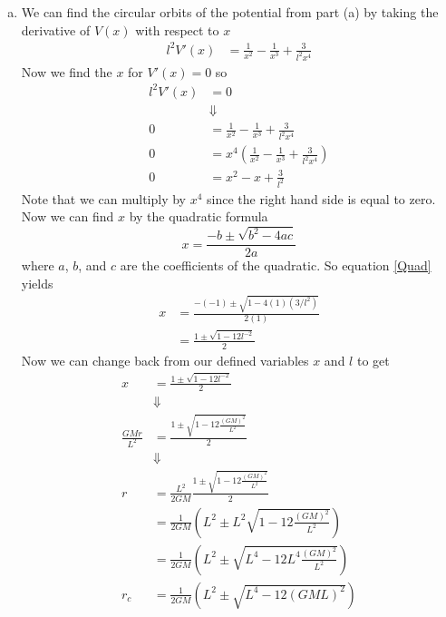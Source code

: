 \documentclass[11pt]{article}
\numberwithin{equation}{section}
\begin{document}
\begin{enumerate}[(a)]
\item
We can find the circular orbits of the potential from part (a) by taking the derivative of $V(x)$ with respect to $x$
\begin{align*}
l^2V'(x) &= \frac{1}{x^2} - \frac{1}{x^3} + \frac{3}{l^2x^4}
\end{align*}
Now we find the $x$ for $V'(x)=0$ so
\begin{align*}
l^2V'(x) &= 0\\
&\Downarrow\\
0 &= \frac{1}{x^2} - \frac{1}{x^3} + \frac{3}{l^2x^4}\\
0 &= x^4\left(\frac{1}{x^2} - \frac{1}{x^3} + \frac{3}{l^2x^4}\right)\\
0 &= x^2 - x + \frac{3}{l^2}
\end{align*}
Note that we can multiply by $x^4$ since the right hand side is equal to zero. Now we can find $x$ by the quadratic formula
\begin{equation}
x = \frac{-b \pm \sqrt{b^2-4ac}}{2a}
\label{Quad}
\end{equation}
where $a$, $b$, and $c$ are the coefficients of the quadratic. So equation \ref{Quad} yields
\begin{align*}
x &= \frac{-(-1) \pm \sqrt{1 - 4(1)(3/l^2)}}{2(1)}\\
&= \frac{1 \pm \sqrt{1 - 12l^{-2}}}{2}
\end{align*}
Now we can change back from our defined variables $x$ and $l$ to get 
\begin{align*}
x &= \frac{1 \pm \sqrt{1 - 12l^{-2}}}{2}\\
&\Downarrow\\
\frac{GMr}{L^2} &= \frac{1 \pm \sqrt{1 - 12\frac{(GM)^2}{L^2}}}{2}\\
&\Downarrow\\
r &= \frac{L^2}{2GM}\frac{1 \pm \sqrt{1 - 12\frac{(GM)^2}{L^2}}}{2}\\
&= \frac{1}{2GM}\left(L^2 \pm L^2\sqrt{1 - 12\frac{(GM)^2}{L^2}}\right)\\
&= \frac{1}{2GM}\left(L^2 \pm \sqrt{L^4 - 12L^4\frac{(GM)^2}{L^2}}\right)\\
r_c &= \frac{1}{2GM}\left(L^2 \pm \sqrt{L^4 - 12(GML)^2}\right)
\end{align*}


\end{enumerate}
\end{document}
